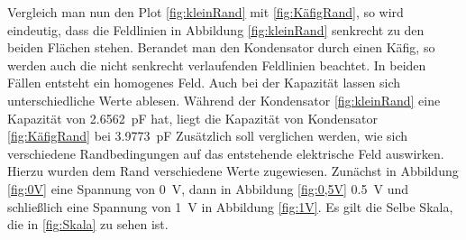 Vergleich man nun den Plot \ref{fig:kleinRand} mit \ref{fig:KäfigRand}, so wird eindeutig, dass die Feldlinien in Abbildung \ref{fig:kleinRand} senkrecht zu den beiden Flächen stehen. Berandet man den Kondensator durch einen Käfig, so werden auch die nicht senkrecht verlaufenden Feldlinien beachtet. In beiden Fällen entsteht ein homogenes Feld. Auch bei der Kapazität lassen sich unterschiedliche Werte ablesen. Während der Kondensator \ref{fig:kleinRand} eine Kapazität von \SI{2,6562}{\pico\farad} hat, liegt die Kapazität von Kondensator \ref{fig:KäfigRand} bei \SI{3,9773}{\pico\farad} \newpage
Zusätzlich soll verglichen werden, wie sich verschiedene Randbedingungen auf das entstehende elektrische Feld auswirken. Hierzu wurden dem Rand verschiedene Werte zugewiesen. Zunächst in Abbildung \ref{fig:0V} eine Spannung von \SI{0}{\volt}, dann in Abbildung \ref{fig:0,5V} \SI{0,5}{\volt} und schließlich eine Spannung von \SI{1}{\volt} in Abbildung \ref{fig:1V}. Es gilt die Selbe Skala, die in \ref{fig:Skala} zu sehen ist.

